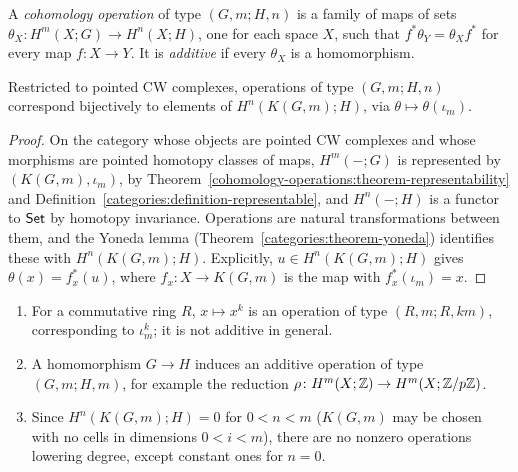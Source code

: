 \begin{definition}\label{cohomology-operations:definition-operation}
A \emph{cohomology operation} of type $(G, m; H, n)$ is a family of maps of sets $\theta_X \colon H^m(X; G) \to H^n(X; H)$, one for each space $X$, such that
$f^*\theta_Y = \theta_X f^*$ for every map $f \colon X \to Y$. It is \emph{additive} if every $\theta_X$ is a homomorphism.
\end{definition}

\begin{proposition}\label{cohomology-operations:proposition-operations-representable}
Restricted to pointed CW complexes, operations of type $(G, m; H, n)$ correspond bijectively to elements of $H^n(K(G, m); H)$, via $\theta \mapsto \theta(\iota_m)$.
\end{proposition}

\begin{proof}
On the category whose objects are pointed CW complexes and whose morphisms are pointed homotopy classes of maps, $H^m(-; G)$ is represented by $(K(G, m), \iota_m)$, by
Theorem~\ref{cohomology-operations:theorem-representability} and Definition~\ref{categories:definition-representable}, and $H^n(-; H)$ is a functor to $\mathsf{Set}$ by
homotopy invariance. Operations are natural transformations between them, and the Yoneda lemma (Theorem~\ref{categories:theorem-yoneda}) identifies these with
$H^n(K(G, m); H)$. Explicitly, $u \in H^n(K(G, m); H)$ gives $\theta(x) = f_x^*(u)$, where $f_x \colon X \to K(G, m)$ is the map with $f_x^*(\iota_m) = x$.
\end{proof}

\begin{example}\label{cohomology-operations:example-operations}
\begin{enumerate}
\item For a commutative ring $R$, $x \mapsto x^k$ is an operation of type $(R, m; R, km)$, corresponding to $\iota_m^k$; it is not additive in general.
\item A homomorphism $G \to H$ induces an additive operation of type $(G, m; H, m)$, for example the reduction $\rho \colon H^m(X; \mathbb{Z}) \to H^m(X; \mathbb{Z}/p\mathbb{Z})$.
\item Since $H^n(K(G, m); H) = 0$ for $0 < n < m$ ($K(G, m)$ may be chosen with no cells in dimensions $0 < i < m$), there are no nonzero operations lowering degree, except
constant ones for $n = 0$.
\end{enumerate}
\end{example}

